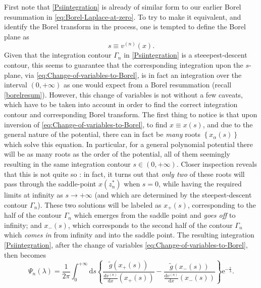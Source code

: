 \documentclass[11pt,a4paper]{article}
\newcommand{\rme}{{\mathrm{e}}}
\newcommand{\rmd}{{\mathrm{d}}}
\begin{document}
First note that \eqref{Psiintegration} is already of similar form to our earlier Borel resummation in \eqref{eq:Borel-Laplace-at-zero}. To try to make it equivalent, and identify the Borel transform in the process, one is tempted to define the Borel plane as
%
\begin{equation}
\label{eq:Change-of-variables-to-Borel}
s \equiv v^{(n)}(x).
\end{equation}
%
\noindent
Given that the integration contour $\Gamma_n$ in \eqref{Psiintegration} is a steeepest-descent contour, this seems to guarantee that the corresponding integration upon the $s$-plane, via \eqref{eq:Change-of-variables-to-Borel}, is in fact an integration over the interval $(0,+\infty)$ as one would expect from a Borel resummation (recall \eqref{borelresum}). However, this change of variables is not without a few caveats, which have to be taken into account in order to find the correct integration contour and corresponding Borel transform. The first thing to notice is that upon inversion of \eqref{eq:Change-of-variables-to-Borel}, to find $x \equiv x(s)$, and due to the general nature of the potential, there can in fact be \textit{many} roots $\left\{ x_{\alpha}(s) \right\}$ which solve this equation. In particular, for a general polynomial potential there will be as many roots as the order of the potential, all of them seemingly resulting in the same integration contour $s \in (0,+\infty)$. Closer inspection reveals that this is not quite so \cite{bh91}: in fact, it turns out that \textit{only two} of these roots will pass through the saddle-point $x(z^*_n)$ when $s=0$, while having the required limits at infinity as $s \to +\infty$ (and which are determined by the steepest-descent contour $\Gamma_n$). These two solutions will be labeled as $x_{+}(s)$, corresponding to the half of the contour $\Gamma_n$ which emerges from the saddle point and \textit{goes off} to infinity; and $x_{-}(s)$, which corresponds to the second half of the contour $\Gamma_n$ which \textit{comes in} from infinity and into the saddle point. The resulting integration \eqref{Psiintegration}, after the change of variables \eqref{eq:Change-of-variables-to-Borel}, then becomes
%
\begin{equation}
\label{eq:BorelINV-Psi-n}
\Psi_{n} (\lambda) = \frac{1}{2\pi} \int_{0}^{+\infty} \rmd s \left\{ \frac{\widetilde{g} \left( x_{+}(s) \right)}{\frac{\rmd v^{(n)}}{\rmd x} \left( x_{+}(s) \right)} - \frac{\widetilde{g} \left( x_{-}(s) \right)}{\frac{\rmd v^{(n)}}{\rmd x} \left( x_{-}(s) \right)}\right\} \rme^{- \frac{s}{\lambda}}.
\end{equation}
\end{document}
